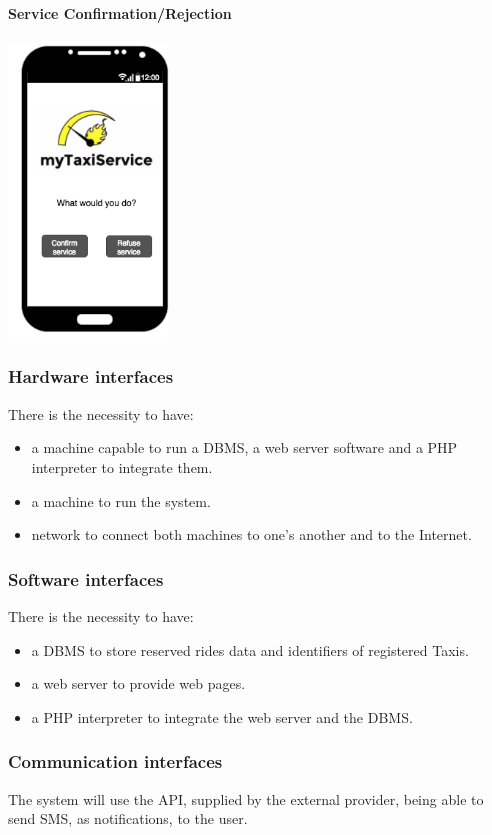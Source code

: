 		\paragraph{Service Confirmation/Rejection}
		\begin{center}
		    \includegraphics[width=0.32\textwidth]{./images/TELEFONO7}
		\end{center}
		
		\subsubsection{Hardware interfaces}
			There is the necessity to have:
			\begin{itemize}
				\item a machine capable to run a DBMS, a web server software and a PHP interpreter to integrate them.
				\item a machine to run the system.
				\item network to connect both machines to one's another and to the Internet.
			\end{itemize}
		\subsubsection{Software interfaces}
			There is the necessity to have:
			\begin{itemize}
				\item a DBMS to store reserved rides data and identifiers of registered Taxis.
				\item a web server to provide web pages.
				\item a PHP interpreter to integrate the web server and the DBMS.
			\end{itemize}
		\subsubsection{Communication interfaces}
			The system will use the API, supplied by the external provider, being able to send SMS, as notifications, to the user. 
